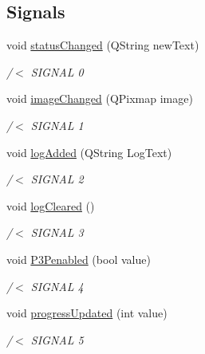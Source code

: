 \subsection*{Signals}
\begin{DoxyCompactItemize}
\item 
void \hyperlink{classcomm_object_adccf5b5946d35d5cf6d76f367f93e335}{status\+Changed} (Q\+String new\+Text)
\begin{DoxyCompactList}\small\item\em /$<$ S\+I\+G\+N\+AL 0 \end{DoxyCompactList}\item 
void \hyperlink{classcomm_object_a3828eab6be234f6216a6f80a6a82e41e}{image\+Changed} (Q\+Pixmap image)
\begin{DoxyCompactList}\small\item\em /$<$ S\+I\+G\+N\+AL 1 \end{DoxyCompactList}\item 
void \hyperlink{classcomm_object_a72620fe1bac16309baf6d148644edaf9}{log\+Added} (Q\+String Log\+Text)
\begin{DoxyCompactList}\small\item\em /$<$ S\+I\+G\+N\+AL 2 \end{DoxyCompactList}\item 
void \hyperlink{classcomm_object_af2304085624c26230e9d930d616e3e19}{log\+Cleared} ()
\begin{DoxyCompactList}\small\item\em /$<$ S\+I\+G\+N\+AL 3 \end{DoxyCompactList}\item 
void \hyperlink{classcomm_object_af369de87a7f2c9b7170223bedd6c08d9}{P3\+Penabled} (bool value)
\begin{DoxyCompactList}\small\item\em /$<$ S\+I\+G\+N\+AL 4 \end{DoxyCompactList}\item 
void \hyperlink{classcomm_object_a6039d306f25a6b46c78942edf9cee662}{progress\+Updated} (int value)
\begin{DoxyCompactList}\small\item\em /$<$ S\+I\+G\+N\+AL 5 \end{DoxyCompactList}\end{DoxyCompactItemize}
